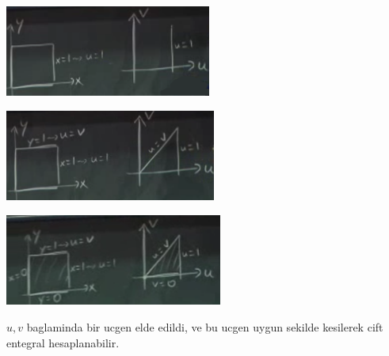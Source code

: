 \documentclass[12pt,fleqn]{article}\usepackage{../common}
\begin{document}
\includegraphics[height=3cm]{18_9.png}

\includegraphics[height=3cm]{18_10.png}

\includegraphics[height=3cm]{18_11.png}

$u,v$ baglaminda bir ucgen elde edildi, ve bu ucgen uygun sekilde kesilerek
cift entegral hesaplanabilir. 
\end{document}
